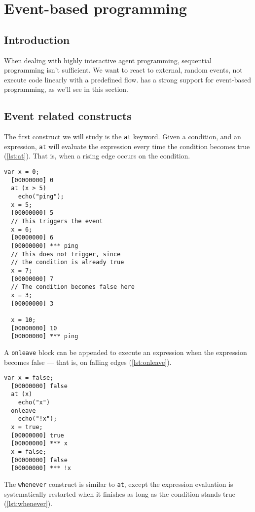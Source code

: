 \documentclass[openright,twoside,12pt]{report}
\newcommand{\lst}[1]{\autoref{lst:#1}}
\begin{document}

\chapter{Event-based programming}

\section{Introduction}

When dealing with highly interactive agent programming, sequential
programming isn't sufficient. We want to react to external, random
events, not execute code linearly with a predefined flow. \urbi has a
strong support for event-based programming, as we'll see in this
section.

\section{Event related constructs}

The first construct we will study is the \lstinline|at| keyword. Given
a condition, and an expression, \lstinline|at| will evaluate the
expression every time the condition becomes true (\lst{at}). That is,
when a rising edge occurs on the condition.

\begin{lstlisting}[caption=Using \texttt{at}, label=lst:at]
  var x = 0;
  [00000000] 0
  at (x > 5)
    echo("ping");
  x = 5;
  [00000000] 5
  // This triggers the event
  x = 6;
  [00000000] 6
  [00000000] *** ping
  // This does not trigger, since
  // the condition is already true
  x = 7;
  [00000000] 7
  // The condition becomes false here
  x = 3;
  [00000000] 3

  x = 10;
  [00000000] 10
  [00000000] *** ping
\end{lstlisting}

A \lstinline|onleave| block can be appended to execute an expression
when the expression becomes false --- that is, on falling edges (\lst{onleave}).

\begin{lstlisting}[caption=Using \texttt{at ... onleave},
  label=lst:onleave]
  var x = false;
  [00000000] false
  at (x)
    echo("x")
  onleave
    echo("!x");
  x = true;
  [00000000] true
  [00000000] *** x
  x = false;
  [00000000] false
  [00000000] *** !x
\end{lstlisting}

The \lstinline|whenever| construct is similar to \lstinline|at|,
except the expression evaluation is systematically restarted when it
finishes as long as the condition stands true (\lst{whenever}).
\end{document}
